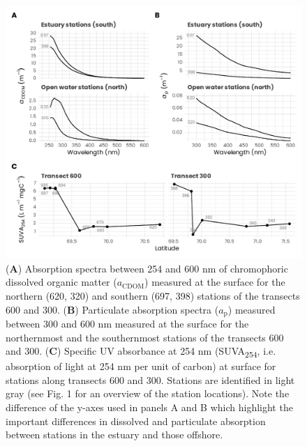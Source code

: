 \documentclass[essd, manuscript]{copernicus}
\begin{document}
\begin{figure}[H]
    \centering
    \includegraphics[scale = 1]{../../../graphs/fig07.pdf}
    \caption{(\textbf{A}) Absorption spectra between 254 and 600 nm of chromophoric dissolved organic matter ($a_{\text{CDOM}}$) measured at the surface for the northern (620, 320) and southern (697, 398) stations of the transects 600 and 300. (\textbf{B}) Particulate absorption spectra ($a_{\text{p}}$) measured between 300 and 600 nm measured at the surface for the northernmost and the southernmost stations of the transects 600 and 300. (\textbf{C}) Specific UV absorbance at 254 nm (SUVA\textsubscript{254}, i.e. absorption of light at 254 nm per unit of carbon) at surface for stations along transects 600 and 300. Stations are identified in light gray (see Fig. 1 for an overview of the station locations). Note the difference of the y-axes used in panels A and B which highlight the important differences in dissolved and particulate absorption between stations in the estuary and those offshore.}
\end{figure}

\clearpage
\end{document}
